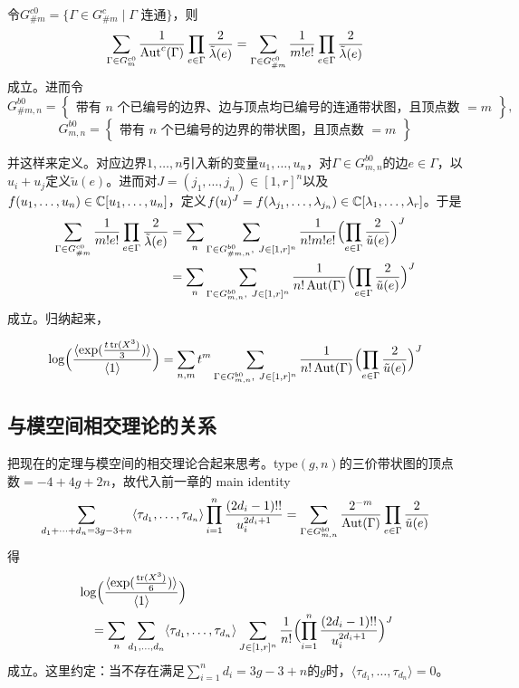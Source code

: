 令$G_{\#m}^{c0}=\{\Gamma\in G_{\#m}^c\mid\Gamma\text{ 连通}\}$，则
\[
\sum_{\Gamma\in G_m^{c0}}\frac{1}{\operatorname{Aut}^c(\Gamma)}
\prod_{e\in\Gamma}\frac{2}{\tilde\lambda(e)}
=\sum_{\Gamma\in G_{\#m}^{c0}}\frac{1}{m!e!}
\prod_{e\in\Gamma}\frac{2}{\tilde\lambda(e)}
\]
成立。进而令
\[
G_{\#m,n}^{b0}=\left\{\begin{array}{l}
\text{带有 $n$ 个已编号的边界、边与顶点均已编号的连通带状图，且顶点数 $=m$}
\end{array}\right\},
\]
\[
G_{m,n}^{b0}=\left\{\begin{array}{l}
\text{带有 $n$ 个已编号的边界的带状图，且顶点数 $=m$}
\end{array}\right\}
\]

并这样来定义。对应边界$1,\dots,n$引入新的变量$u_1,\dots,u_n$，对$\Gamma\in G_{m,n}^{b0}$的边$e\in\Gamma$，以$u_i+u_j$定义$\tilde u(e)$。进而对$J=(j_1,\dots,j_n)\in[1,r]^n$以及$f(u_1,\dots,u_n)\in\mathbb{C}[u_1,\dots,u_n]$，定义$f(u)^J=f(\lambda_{j_1},\dots,\lambda_{j_n})\in\mathbb{C}[\lambda_1,\dots,\lambda_r]$。于是
\[
\begin{aligned}
\sum_{\Gamma\in G_{\#m}^{c0}}\frac{1}{m!e!}
\prod_{e\in\Gamma}\frac{2}{\tilde\lambda(e)}
&=\sum_n\sum_{\Gamma\in G_{\#m,n}^{b0},\ J\in[1,r]^n}
\frac{1}{n!m!e!}\Bigl(\prod_{e\in\Gamma}\frac{2}{\tilde u(e)}\Bigr)^J\\
&=\sum_n\sum_{\Gamma\in G_{m,n}^{b0},\ J\in[1,r]^n}
\frac{1}{n!\operatorname{Aut}(\Gamma)}\Bigl(\prod_{e\in\Gamma}\frac{2}{\tilde u(e)}\Bigr)^J
\end{aligned}
\]
成立。归纳起来，

\begin{theorem}
\[
\log\Bigl(\frac{\langle\exp(\frac{t\operatorname{tr}(X^3)}{3})\rangle}{\langle 1\rangle}\Bigr)
=\sum_{n,m}t^m\sum_{\Gamma\in G_{m,n}^{b0},\ J\in[1,r]^n}
\frac{1}{n!\operatorname{Aut}(\Gamma)}\Bigl(\prod_{e\in\Gamma}\frac{2}{\tilde u(e)}\Bigr)^J
\]
\end{theorem}

\subsection{与模空间相交理论的关系}

把现在的定理与模空间的相交理论合起来思考。type$(g,n)$的三价带状图的顶点数$=-4+4g+2n$，故代入前一章的 main identity
\[
\sum_{d_1+\cdots+d_n=3g-3+n}
\langle\tau_{d_1},\dots,\tau_{d_n}\rangle
\prod_{i=1}^{n}\frac{(2d_i-1)!!}{u_i^{2d_i+1}}
=\sum_{\Gamma\in G_{m,n}^{b0}}\frac{2^{-m}}{\operatorname{Aut}(\Gamma)}
\prod_{e\in\Gamma}\frac{2}{\tilde u(e)}
\]
得
\[
\begin{aligned}
&\log\Bigl(\frac{\langle\exp(\frac{\operatorname{tr}(X^3)}{6})\rangle}{\langle 1\rangle}\Bigr)\\
&\quad=\sum_n\sum_{d_1,\dots,d_n}\langle\tau_{d_1},\dots,\tau_{d_n}\rangle
\sum_{J\in[1,r]^n}\frac{1}{n!}
\Bigl(\prod_{i=1}^{n}\frac{(2d_i-1)!!}{u_i^{2d_i+1}}\Bigr)^J
\end{aligned}
\]
成立。这里约定：当不存在满足$\sum_{i=1}^n d_i=3g-3+n$的$g$时，$\langle\tau_{d_1},\dots,\tau_{d_n}\rangle=0$。

